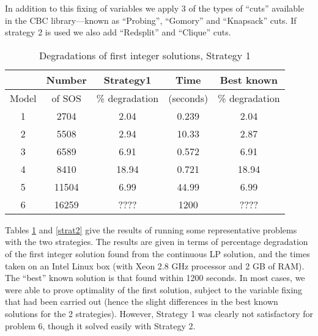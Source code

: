 \documentclass[finalversion,simpleeqnnos]{yrl}
\begin{document}
In addition to this fixing of variables we apply 3 of the types of ``cuts'' available in the CBC library---known as ``Probing'', ``Gomory'' and ``Knapsack'' cuts. If strategy 2 is used we also add ``Redsplit'' and ``Clique'' cuts.

\begin{table}[htbp]
\begin{centering}
\begin{tabular}{|| c | c | c | c | c ||}
\hline
 & Number & Strategy1 & Time & Best known \\ \hline
Model & of SOS &\% degradation & (seconds) & \% degradation \\ \hline
1 & 2704 & 2.04   & 0.239& 2.04 \\ \hline
2 & 5508 & 2.94 & 10.33 & 2.87 \\ \hline 
3 & 6589 & 6.91 & 0.572 & 6.91 \\ \hline 
4 & 8410 & 18.94 & 0.721 & 18.94 \\ \hline 
5 & 11504 & 6.99 & 44.99 & 6.99 \\ \hline 
6 & 16259 & ???? & 1200 & ???? \\ \hline 
\end{tabular}
\caption{Degradations of first integer solutions, Strategy 1}
\label{strat1}
\end{centering}
\end{table}

Tables \ref{strat1} and \ref{strat2} give the results of running some representative problems with the two strategies. The results are given in terms of percentage degradation of the first integer solution found from the continuous LP solution, and the times taken on an Intel Linux box (with Xeon 2.8 GHz processor and   2 GB of RAM). The ``best'' known solution is that found within 1200 seconds. In most cases, we were able to prove optimality of the first solution, subject to the variable fixing that had been carried out (hence the slight differences in the best known solutions for the 2 strategies). However, Strategy 1 was clearly not satisfactory for problem 6, though it solved easily with Strategy 2.
\end{document}
